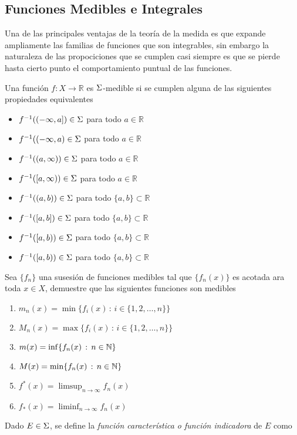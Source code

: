\documentclass[main.tex]{subfiles}
\begin{document}
\subsection{Funciones Medibles e Integrales}
\noindent Una de las principales ventajas de la teoría de la medida es que expande ampliamente las familias de funciones que son integrables, sin embargo la naturaleza de las propociciones que se cumplen casi siempre es que se pierde hasta cierto punto el comportamiento puntual de las funciones.
\begin{def.}
Una función $f: X \to \mathbb{R}$ es $\Sigma$-medible si se cumplen alguna de las siguientes propiedades equivalentes
\begin{itemize}
  \item $f^{-1}((-\infty, a]) \in \Sigma$ para todo $a \in \mathbb{R}$
  \item $f^{-1}((-\infty, a) \in \Sigma$ para todo $a \in \mathbb{R}$
  \item $f^{-1}((a, \infty)) \in \Sigma$ para todo $a \in \mathbb{R}$
  \item $f^{-1}([a, \infty)) \in \Sigma$ para todo $a \in \mathbb{R}$
  \item $f^{-1}((a, b)) \in \Sigma$ para todo $\{a,b\} \subset \mathbb{R}$
  \item $f^{-1}([a, b]) \in \Sigma$ para todo $\{a,b\} \subset \mathbb{R}$
  \item $f^{-1}([a, b)) \in \Sigma$ para todo $\{a,b\} \subset \mathbb{R}$
  \item $f^{-1}([a, b)) \in \Sigma$ para todo $\{a,b\} \subset \mathbb{R}$
\end{itemize}
\end{def.}
\exe Sea $\{f_n\}$ una susesión de funciones medibles tal que $\{f_n(x)\}$ es acotada ara toda $x\in X$, demuestre que las siguientes funciones son medibles
\begin{enumerate}
\item $m_n(x)=\min\{f_i(x)\,:\,i\in\{1,2,\dots,n\}\}$
\item $M_n(x)=\max\{f_i(x)\,:\,i\in\{1,2,\dots,n\}\}$
\item $m(x)=\inf\{f_n(x)\,:\,n\in \mathbb N \}$
\item $M(x)=\min\{f_n(x)\,:\,n\in \mathbb N \}$
\item $f^{*}(x)=\limsup_{n\to\infty}f_n(x)$
\item $f_*(x)=\liminf_{n\to\infty}f_n(x)$
\end{enumerate}
\eje Dado $E\in\Sigma$, se define la \emph{función característica o función indicadora} de $E$ como
\end{document}
